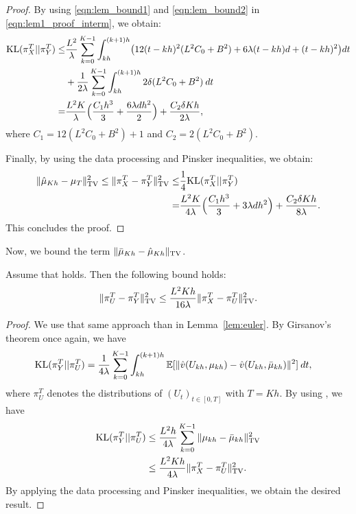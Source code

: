 \begin{proof}
By using \eqref{eqn:lem_bound1} and \eqref{eqn:lem_bound2} in \eqref{eqn:lem1_proof_interm}, we obtain:
\begin{align}
\nonumber \textnormal{KL} (\pi_{X}^T || \pi_{Y}^T) \leq& \frac{L^2}{\lambda} \sum_{k=0}^{K-1} \int_{kh}^{(k+1)h} \bigl(12(t-kh)^2 (L^2 C_0 + B^2) + 6\lambda (t-kh)d +(t-kh)^2 \bigr) dt\\
&+  \frac1{2 \lambda} \sum_{k=0}^{K-1} \int_{kh}^{(k+1)h} 2 \delta(L^2 C_0 + B^2) \> dt \\
=& \frac{L^2 K}{\lambda} \Bigl( \frac{C_1 h^3}{3} + \frac{6 \lambda d h^2}{2} \Bigr) + \frac{C_2 \delta K h}{2\lambda},
\end{align}
where $C_1 = 12(L^2 C_0 + B^2)+1$ and $C_2 = 2 (L^2 C_0 + B^2)$.

Finally, by using the data processing and Pinsker inequalities, we obtain:
\begin{align}
\| \hat{\mu}_{Kh} - \mu_{T} \|_{\textnormal{TV}}^2 \leq \| \pi_{X}^T - \pi_{Y}^T \|_{\textnormal{TV}}^2 \leq& \frac1{4} \textnormal{KL} (\pi_{X}^T || \pi_{Y}^T) \\
=& \frac{L^2 K}{4\lambda} \Bigl( \frac{C_1 h^3}{3} + 3 \lambda d h^2 \Bigr) + \frac{C_2 \delta K h}{8\lambda}.
\end{align}
This concludes the proof.
%
\end{proof}


Now, we bound the term $\| \bar{\mu}_{Kh} - \hat{\mu}_{Kh} \|_{\textnormal{TV}}$.
\begin{lemma}
\label{lem:euler2}
Assume that  holds. Then the following bound holds:
\begin{align}
\| \pi_{U}^T - \pi_{Y}^T \|_{\textnormal{TV}}^2  \leq \frac{L^2 K h}{16 \lambda}  \|\pi_{X}^T - \pi_{U}^T \|_{\textnormal{TV}}^2 .
\end{align}
\end{lemma}
%
\begin{proof}
We use that same approach than in Lemma~\ref{lem:euler}. By Girsanov's theorem once again, we have
\begin{align}
\textnormal{KL} (\pi_{Y}^T || \pi_{U}^T) &= \frac1{4 \lambda} \sum_{k=0}^{K-1} \int_{kh}^{(k+1)h} \mathbb{E}[ \|\hat{v}(U_{kh}, \mu_{kh}) - \hat{v}(U_{kh},\bar{\mu}_{kh}) \|^2 ] \> dt,
\end{align}
where $\pi_U^T$ denotes the distributions of $(U_t)_{t \in [0,T]}$ with $T = Kh$. By using , we have
\begin{align}
\textnormal{KL} (\pi_{Y}^T || \pi_{U}^T) &\leq \frac{L^2 h}{4 \lambda} \sum_{k=0}^{K-1} \|\mu_{kh} - \bar{\mu}_{kh} \|_{\textnormal{TV}}^2   \\
&\leq \frac{L^2 K h}{4 \lambda}  \|\pi_{X}^T - \pi_{U}^T \|_{\textnormal{TV}}^2  .
\end{align}
By applying the data processing and Pinsker inequalities, we obtain the desired result.
\end{proof}

